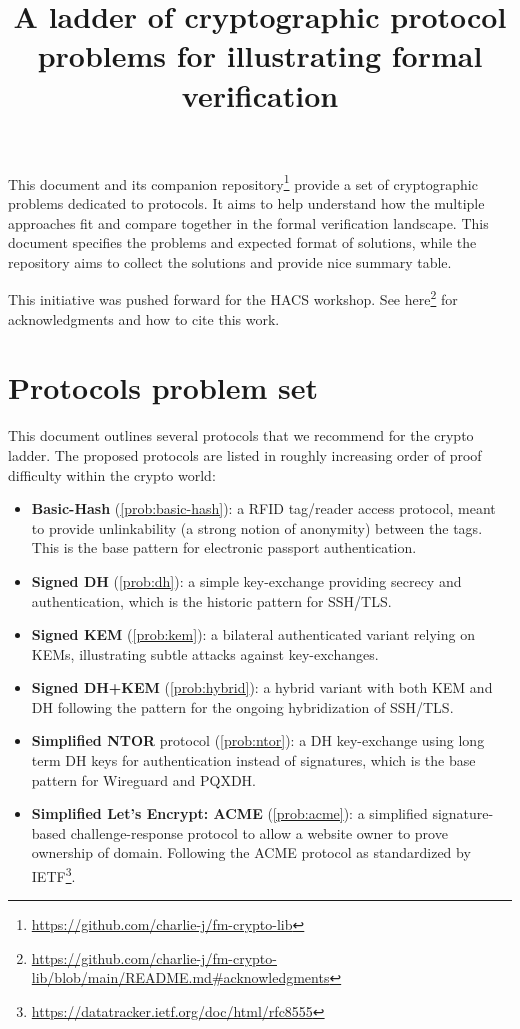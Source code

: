 \documentclass{article}
\title{A ladder of cryptographic protocol problems for illustrating formal verification}
\begin{document}
\maketitle

This document and its companion repository\footnote{\url{https://github.com/charlie-j/fm-crypto-lib}} provide a set of cryptographic problems dedicated to protocols. It aims to help understand how the multiple approaches fit and compare together in the formal verification landscape. This document specifies the problems and expected format of solutions, while the repository aims to collect the solutions and provide nice summary table.

This initiative was pushed forward for the HACS workshop. See here\footnote{\url{https://github.com/charlie-j/fm-crypto-lib/blob/main/README.md\#acknowledgments}} for acknowledgments and how to cite this work.

\section{Protocols problem set}
This document outlines several protocols that we recommend for the crypto ladder.
The proposed protocols are listed in roughly increasing order of proof difficulty within the crypto world:
\begin{itemize}
\item \textbf{Basic-Hash} (\cref{prob:basic-hash}): a RFID tag/reader access protocol, meant to provide unlinkability (a strong notion of anonymity) between the tags. This is the base pattern for electronic passport authentication.
\item \textbf{Signed DH} (\cref{prob:dh}): a simple key-exchange providing secrecy and authentication, which is the historic pattern for SSH/TLS.
\item \textbf{Signed KEM} (\cref{prob:kem}): a bilateral authenticated variant relying on KEMs, illustrating subtle attacks against key-exchanges. 
\item  \textbf{Signed DH+KEM} (\cref{prob:hybrid}): a hybrid variant with both KEM and DH following the pattern for the ongoing hybridization of SSH/TLS.
\item \textbf{Simplified NTOR} protocol (\cref{prob:ntor}): a DH key-exchange using long term DH keys for authentication instead of signatures, which is the base pattern for Wireguard and PQXDH.
\item \textbf{Simplified Let's Encrypt: ACME} (\cref{prob:acme}): a simplified signature-based challenge-response protocol to allow a website owner to prove ownership of domain. Following the ACME protocol as standardized by IETF\footnote{\url{https://datatracker.ietf.org/doc/html/rfc8555}}.
\end{itemize}
\end{document}
